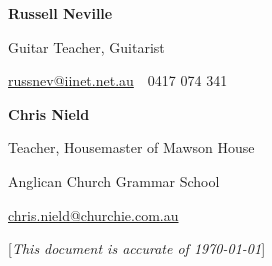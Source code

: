 \documentclass[a4paper,10pt,oneside]{article}
\newcommand{\CVNote}{This document is accurate of {\today}}
\begin{document}
\begin{body}
\textbf{Russell Neville}
\par
Guitar Teacher, Guitarist
\begin{detail}
\href{mailto:russnev@iinet.net.au}
{russnev@iinet.net.au}
\,\BulletSymbol\,
0417 074 341
\end{detail}

\EntryGap
\textbf{Chris Nield}
\par
Teacher, Housemaster of Mawson House
\begin{detail}
Anglican Church Grammar School
\par
\href{mailto:chris.nield@churchie.com.au}
{chris.nield@churchie.com.au}
\end{detail}





\end{body}


\begin{flushright}
\scriptsize%
[\textit{\CVNote}]%
\hspace{2.0mm}\null
\end{flushright}

\label{LastPage}~
\end{document}
